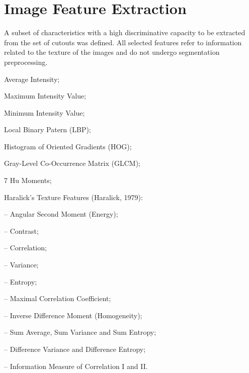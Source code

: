 \chapter{Image Feature Extraction}

A subset of characteristics
with a high discriminative capacity
to be extracted
from the set of cutouts
was defined.
All selected features
refer to information related to the texture of the images
and do not undergo segmentation preprocessing.



Average Intensity;

Maximum Intensity Value;

Minimum Intensity Value;

Local Binary Patern (LBP);

Histogram of Oriented Gradients (HOG);

Gray-Level Co-Occurrence Matrix (GLCM);

7 Hu Moments;

Haralick’s Texture Features (Haralick, 1979):

– Angular Second Moment (Energy);

– Contrast;

– Correlation;

– Variance;

– Entropy;

– Maximal Correlation Coefficient;

– Inverse Difference Moment (Homogeneity);

– Sum Average, Sum Variance and Sum Entropy;

– Difference Variance and Difference Entropy;

– Information Measure of Correlation I and II.




